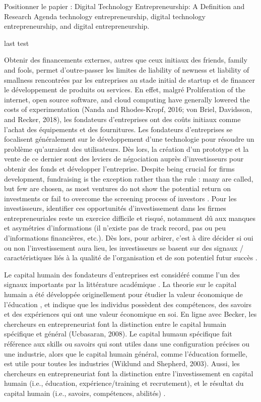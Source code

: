 \documentclass[11pt]{article}
\begin{document}
Positionner le papier :
Digital Technology Entrepreneurship: A Definition and Research Agenda
technology entrepreneurship, digital technology entrepreneurship, and digital entrepreneurship.

last test

Obtenir des financements externes, autres que ceux initiaux des friends, family and fools, permet d'outre-passer les limites de liability of newness et liability of smallness rencontrées par les entreprises au stade initial de startup et de financer le développement de produits ou services. En effet, malgré Proliferation of the internet, open source software, and cloud computing have generally lowered the costs of experimentation (Nanda and Rhodes-Kropf, 2016; von Briel, Davidsson, and Recker, 2018), les fondateurs d'entreprises ont des coûts initiaux comme l'achat des équipements et des fournitures. Les fondateurs d'entreprises se focalisent généralement sur le développement d'une technologie pour résoudre un problème qu'auraient des utilisateurs. Dès lors, la création d'un prototype et la vente de ce dernier sont des leviers de négociation auprès d'investisseurs pour obtenir des fonds et développer l'entreprise. Despite being crucial for firms development, fundraising is the exception rather than the rule : many are called, but few are chosen, as most ventures do not show the potential return on investments or fail to overcome the screening process of investors \citep{huang2017growing}. Pour les investisseurs, identifier ces opportunités d'investissement dans les firmes entrepreneuriales reste un exercice difficile et risqué, notamment dû aux manques et asymétries d'informations (il n'existe pas de track record, pas ou peu d'informations financières, etc.). Dès lors, pour arbirer, c'est à dire décider si oui ou non l'investissement aura lieu, les investisseurs se basent sur des signaux / caractéristiques liés à la qualité de l'organisation et de son potentiel futur succès \citep{plummer2016better}.

Le capital humain des fondateurs d'entreprises est considéré comme l'un des signaux importants par la littérature académique \citet{pinelli2020too, ko2018signaling}. La theorie sur le capital humain a été développée originellement pour étudier la valeur économique de l'éducation \citep{becker1964human}, et indique que les individus possèdent des compétences, des savoirs et des expériences qui ont une valeur économique en soi. En ligne avec Becker, les chercheurs en entrepreneuriat font la distinction entre le capital humain spécifique et général (Ucbasaran, 2008). Le capital humaun spécifique fait référence aux skills ou savoirs qui sont utiles dans une configuration précises ou une industrie, alors que le capital humain général, comme l'éducation formelle, est utile pour toutes les industries (Wiklund and Shepherd, 2003). Aussi, les chercheurs en entrepreneuriat font la distinction entre l'investissement en capital humain (i.e., éducation, expérience/training et recrutement), et le résultat du capital humain (i.e., savoirs, compétences, abilités) \citep{marvel2016human}.
\end{document}
